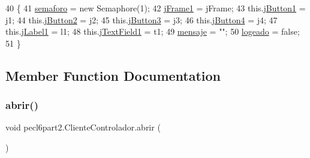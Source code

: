 \begin{DoxyCode}
40         \{
41             \mbox{\hyperlink{classpecl6part2_1_1_cliente_controlador_a200ce4defcaa86a68e9c8234f9e48a81}{semaforo}} = \textcolor{keyword}{new} Semaphore(1);
42             \mbox{\hyperlink{classpecl6part2_1_1_cliente_controlador_a8f6efcec989c5ef5daccf7a9009ffbb2}{jFrame1}} = jFrame;
43             this.\mbox{\hyperlink{classpecl6part2_1_1_cliente_controlador_a5571779a9b4a52006f160ba893b7c62d}{jButton1}} = j1;
44             this.\mbox{\hyperlink{classpecl6part2_1_1_cliente_controlador_a0de10db6dfe46c00048ea574708f4898}{jButton2}} = j2;
45             this.\mbox{\hyperlink{classpecl6part2_1_1_cliente_controlador_a6ed6a9f1bcab81559b649c08fd2a59b8}{jButton3}} = j3;
46             this.\mbox{\hyperlink{classpecl6part2_1_1_cliente_controlador_a4d53fe3682184dc12af7fb5edaa74f3a}{jButton4}} = j4;
47             this.\mbox{\hyperlink{classpecl6part2_1_1_cliente_controlador_a9bc2f24760cd5b88584b4275aa3845db}{jLabel1}} = l1;
48             this.\mbox{\hyperlink{classpecl6part2_1_1_cliente_controlador_a04f4a0311eac4cee8bca8c1617f2f249}{jTextField1}} = t1;
49             \mbox{\hyperlink{classpecl6part2_1_1_cliente_controlador_ac5b6761cd1ff976535207035f94a6396}{mensaje}} = \textcolor{stringliteral}{""};
50             \mbox{\hyperlink{classpecl6part2_1_1_cliente_controlador_a3af6d2071d85755b557cf2a98fca51d5}{logeado}} = \textcolor{keyword}{false};
51         \}
\end{DoxyCode}


\subsection{Member Function Documentation}
\mbox{\label{classpecl6part2_1_1_cliente_controlador_a77cde1bf892e57d766c03a80a107d2f9}} 
\subsubsection{\texorpdfstring{abrir()}{abrir()}}
{\footnotesize\ttfamily void pecl6part2.\+Cliente\+Controlador.\+abrir (\begin{DoxyParamCaption}{ }\end{DoxyParamCaption})\hspace{0.3cm}{\ttfamily [inline]}}


